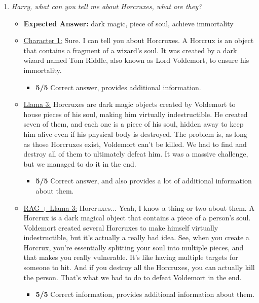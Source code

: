 \documentclass[fleqn,moreauthors,10pt]{ds_report}
\begin{document}
\begin{appendices}
\begin{enumerate}
                \item  \textit{Harry, what can you tell me about Horcruxes, what are they?}
                \begin{itemize}
                    \item \textbf{Expected Answer:} dark magic, piece of soul, achieve immortality
                    \item \underline{Character 1:} Sure. I can tell you about Horcruxes. A Horcrux is an object that contains a fragment of a wizard's soul. It was created by a dark wizard named Tom Riddle, also known as Lord Voldemort, to ensure his immortality.
                    \begin{itemize}
                        \item \textbf{5/5} Correct answer, provides additional information.
                    \end{itemize}        
                    \item \underline{Llama 3:} Horcruxes are dark magic objects created by Voldemort to house pieces of his soul, making him virtually indestructible. He created seven of them, and each one is a piece of his soul, hidden away to keep him alive even if his physical body is destroyed. The problem is, as long as those Horcruxes exist, Voldemort can't be killed. We had to find and destroy all of them to ultimately defeat him. It was a massive challenge, but we managed to do it in the end.
                    \begin{itemize}
                        \item \textbf{5/5} Correct answer, and also provides a lot of additional information about them.
                    \end{itemize}
                    \item \underline{RAG + Llama 3:} Horcruxes... Yeah, I know a thing or two about them. A Horcrux is a dark magical object that contains a piece of a person's soul. Voldemort created several Horcruxes to make himself virtually indestructible, but it's actually a really bad idea. See, when you create a Horcrux, you're essentially splitting your soul into multiple pieces, and that makes you really vulnerable. It's like having multiple targets for someone to hit. And if you destroy all the Horcruxes, you can actually kill the person. That's what we had to do to defeat Voldemort in the end.
                    \begin{itemize}
                        \item \textbf{5/5} Correct information, provides additional information about them.
                    \end{itemize}
                \end{itemize}



\end{enumerate}
\end{appendices}
\end{document}
